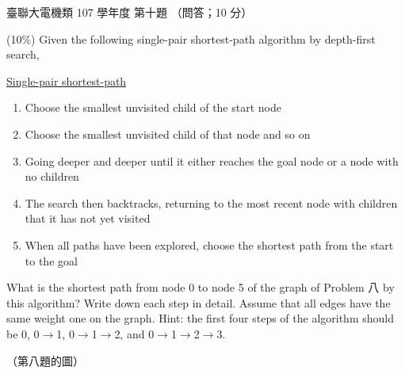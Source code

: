 \begin{pastexam}[label={px:ust-107-ee-ds-10}]{臺聯大電機類 107 學年度 第十題}
（問答；10 分）

(10\%) Given the following single-pair shortest-path algorithm by depth-first search,

\underline{Single-pair shortest-path}
\begin{enumerate}[label=\arabic*.]
\item Choose the smallest unvisited child of the start node
\item Choose the smallest unvisited child of that node and so on
\item Going deeper and deeper until it either reaches the goal node or a node with no children
\item The search then backtracks, returning to the most recent node with children that it has not yet visited
\item When all paths have been explored, choose the shortest path from the start to the goal
\end{enumerate}

What is the shortest path from node 0 to node 5 of the graph of Problem 八 by this algorithm? Write down each step in detail. Assume that all edges have the same weight one on the graph. Hint: the first four steps of the algorithm should be 0, 0$\to$1, 0$\to$1$\to$2, and 0$\to$1$\to$2$\to$3.

\medskip
（第八題的圖）
\begin{center}
\end{center}
\end{pastexam}

